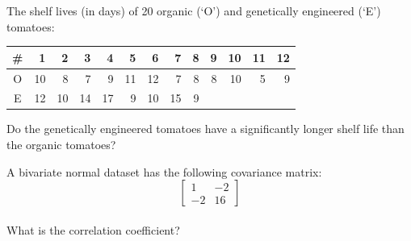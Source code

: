 \documentclass{article}
\begin{document}
\vspace{1cm}

\begin{minipage}{10cm}

  The shelf lives (in days) of 20 organic (`O') and genetically
  engineered (`E') tomatoes:\medskip

    \begin{tabular}{@{}c@{~~}|r@{~~}r@{~~}r@{~~}r@{~~}r@{~~}r@{~~}r@{~~}r@{~~}r@{~~}r@{~~}r@{~~}r@{}}
      \# & 1 & 2 & 3 & 4 & 5 & 6 & 7 & 8 & 9 & 10 & 11 & 12  \\ \hline
      O &  10 & 8 & 7 & 9 & 11 & 12 & 7 & 8 & 8 & 10 & 5 & 9 \\
      E & 12 & 10 & 14 & 17 & 9 & 10 & 15 & 9 & & & & \\
    \end{tabular}\medskip

  Do the genetically engineered tomatoes have a significantly longer
  shelf life than the organic tomatoes?

\end{minipage}

\vspace{1cm}

\begin{minipage}{10cm}

A bivariate normal dataset has the following covariance matrix:\\

\[ \left[\begin{array}{cc} 1 & -2 \\ -2 & 16 \end{array}\right] \]\\

What is the correlation coefficient?

\end{minipage}

\vspace{1cm}
\end{document}
